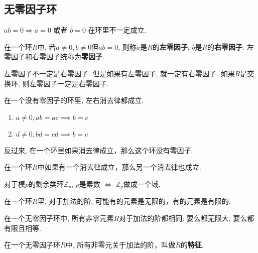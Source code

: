 \subsection{无零因子环}  %

\begin{Note}
$ab = 0 \Rightarrow a = 0 $ 或者 $b = 0$ 在环里不一定成立.
\end{Note}

\begin{Definition}[零因子]
在一个环$R$中, 若$a \neq 0, b \neq 0$但$ab = 0$, 则称$a$是$R$的\textbf{左零因子}, $b$是$R$的\textbf{右零因子}. 左零因子和右零因子统称为\textbf{零因子}.
\end{Definition}

\begin{Remark}
左零因子不一定是右零因子. 但是如果有左零因子, 就一定有右零因子. 如果$R$是交换环, 则左零因子一定是右零因子.
\end{Remark}

\begin{Theorem}[!]
在一个没有零因子的环里, 左右消去律都成立.
\begin{enumerate}
	\item $a \neq 0, ab = ac \implies b = c$
	\item $d \neq 0, bd = cd \implies b = c$
\end{enumerate}
反过来, 在一个环里如果\;\;消去律成立，那么这个环没有零因子.
\end{Theorem}

\begin{Corollary}
在一个环$R$中如果有一个消去律成立，那么另一个消去律也成立.
\end{Corollary}

\begin{Proposition}
对于模$p$的剩余类环$\mathbb{Z}_p$, $p$是素数 $\Leftrightarrow $ $\mathbb{Z}_p$做成一个域.
\end{Proposition}

\begin{Proposition}
在一个环$R$里, 对于加法的阶, 可能有的元素是无限的，有的元素是有限的.
\end{Proposition}

\begin{Theorem}
在一个无零因子环中, 所有非零元素$R$对于加法的阶都相同: 要么都无限大, 要么都有限且相等.
\end{Theorem}

\begin{Definition}[无零因子环的特征]
在一个无零因子环$R$中, 所有非零元关于加法的阶，叫做$R$的\textbf{特征}.
\end{Definition}

